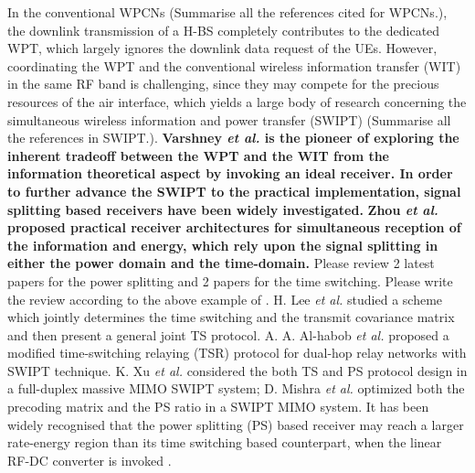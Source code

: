 \documentclass[12pt,draft,onecolumn,journal]{IEEEtran}
\begin{document}
In the conventional WPCNs \cite{wpcn_1,wpcn_2,wpcn_3,wpcn_4,wpcn_5,wpcn_6,wpcn_7,wpcn_8,wpcn_9,wpcn_10,wpcn_11
}{\color{red} (Summarise all the references cited for WPCNs.)}, the downlink transmission of a H-BS completely contributes to the dedicated WPT, which largely ignores the downlink data request of the UEs. However, coordinating the WPT and the conventional wireless information transfer (WIT) in the same RF band is challenging, since they may compete for the precious resources of the air interface, which yields a large body of research concerning the simultaneous wireless information and power transfer (SWIPT) \cite{swipt_5,swipt_6, TS_1, TS_2, PS_1, PS_2} {\color{red} (Summarise all the references in SWIPT.)}. \textbf{Varshney \textit{et al.} \cite{swipt_5} is the pioneer of exploring the inherent tradeoff between the WPT and the WIT from the information theoretical aspect by invoking an ideal receiver. In order to further advance the SWIPT to the practical implementation, signal splitting based receivers have been widely investigated.} \textbf{Zhou \textit{et al.} \cite{swipt_6} proposed practical receiver architectures for simultaneous reception of the information and energy, which rely upon the signal splitting in either the power domain and the time-domain.} {\color{red} Please review 2 latest papers for the power splitting and 2 papers for the time switching. Please write the review according to the above example of \cite{swipt_5,swipt_6}.} H. Lee \textit{et al.} \cite{TS_1} studied a scheme which jointly determines the time switching and the transmit covariance matrix and then present a general joint TS protocol. A. A. Al-habob \textit{et al.} \cite{TS_2} proposed a modified time-switching relaying (TSR) protocol for dual-hop relay networks with SWIPT technique. K. Xu \textit{et al.} \cite{PS_1} considered the both TS and PS protocol design in a full-duplex massive MIMO SWIPT system; D. Mishra \textit{et al.} \cite{PS_2} optimized both the precoding matrix and the PS ratio in a SWIPT MIMO system. It has been widely recognised that the power splitting (PS) based receiver may reach a larger rate-energy region than its time switching based counterpart, when the linear RF-DC converter is invoked \cite{swipt_5}.
\end{document}

